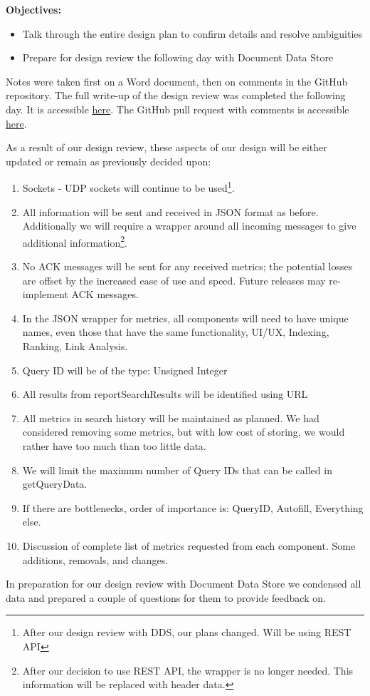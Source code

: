 \medskip

\textbf{Objectives:}
\begin{itemize}
  \item Talk through the entire design plan to confirm details and resolve ambiguities
  \item Prepare for design review the following day with Document Data Store
\end{itemize}
Notes were taken first on a Word document, then on comments in the GitHub repository. The full write-up of the design review was completed the following day. It is accessible \href{https://docs.google.com/document/d/1REwOedsmrtoQbACQpFj3Ti8JiCDlrIysBp8OR26vRdU/edit?tab=t.0}{here}. The GitHub pull request with comments is accessible \href{https://github.com/justinottesen/LSPT-Evaluation/pull/27/commits/00ec74d93f1943b2d434e28471a2d04adcd9872c#diff-b335630551682c19a781afebcf4d07bf978fb1f8ac04c6bf87428ed5106870f5}{here}.

\medskip

As a result of our design review, these aspects of our design will be either updated or remain as previously decided upon:
\begin{enumerate}
  \item Sockets - UDP sockets will continue to be used\footnote{After our design review with DDS, our plans changed. Will be using REST API}.
  \item All information will be sent and received in JSON format as before. Additionally we will require a wrapper around all incoming messages to give additional information\footnote{After our decision to use REST API, the wrapper is no longer needed. This information will be replaced with header data.}.
  \item No ACK messages will be sent for any received metrics; the potential losses are offset by the increased ease of use and speed. Future releases may re-implement ACK messages.
  \item In the JSON wrapper for metrics, all components will need to have unique names, even those that have the same functionality, UI/UX, Indexing, Ranking, Link Analysis.
  \item Query ID will be of the type: Unsigned Integer
  \item All results from reportSearchResults will be identified using URL
  \item All metrics in search history will be maintained as planned. We had considered removing some metrics, but with low cost of storing, we would rather have too much than too little data.
  \item We will limit the maximum number of Query IDs that can be called in getQueryData.
  \item If there are bottlenecks, order of importance is: QueryID, Autofill, Everything else.
  \item Discussion of complete list of metrics requested from each component. Some additions, removals, and changes.
\end{enumerate}
In preparation for our design review with Document Data Store we condensed all data and prepared a couple of questions for them to provide feedback on.

